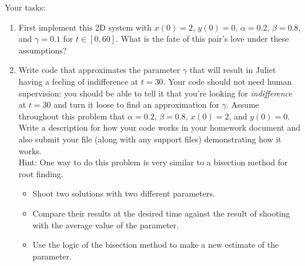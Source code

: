 \begin{problem}
    Your tasks:
    \begin{enumerate}
        \item First implement this 2D system with $x(0) = 2$, $y(0)=0$, $\alpha=0.2$,
            $\beta=0.8$, and $\gamma=0.1$ for $t \in [0,60]$.  What is the fate of this
            pair's love under these assumptions?
        \item Write \ProgLang code that approximates the parameter $\gamma$ that will result
            in Juliet having a feeling of indifference at $t=30$.  Your code should not
            need human supervision: you should be able to tell it that you're looking for
            {\it indifference} at $t=30$ and turn it loose to find an approximation for
            $\gamma$.  Assume throughout this problem that $\alpha=0.2$, $\beta=0.8$,
            $x(0)=2$, and $y(0)=0$. Write a description for how your code works in your
            homework document and also submit your \ProgLang file (along with any support
            files) demonstrating how it works.
            \\
            Hint: One way to do this problem is very similar to a bisection method for
            root finding. 
            \begin{itemize}
                \item Shoot two solutions with two different parameters.
                \item Compare their results at the desired time against the result of
                    shooting with the average value of the parameter.
                \item Use the logic of the bisection method to make a new estimate of the
                    parameter.
            \end{itemize}
    \end{enumerate}
\end{problem}

